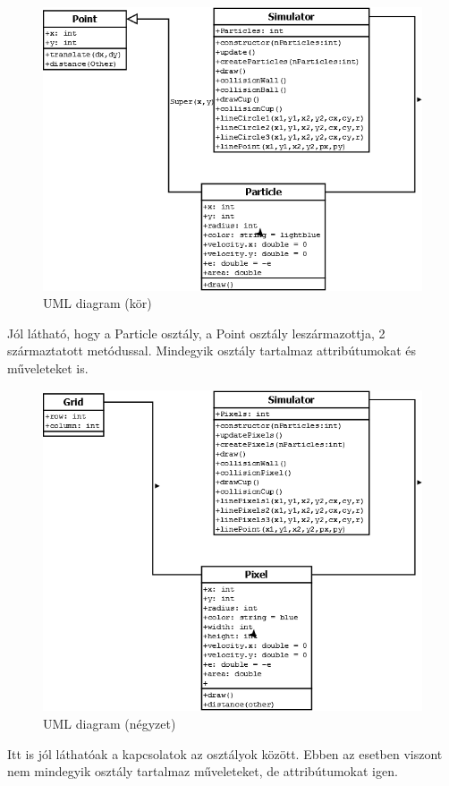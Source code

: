 \begin{figure}[h]
	\centering
	\includegraphics[width=\textwidth]{images/Diagram1.png}
	\caption{UML diagram (kör)}
	\label{fig:dia1}
\end{figure}


Jól látható, hogy a Particle osztály, a Point osztály leszármazottja, 2 származtatott metódussal.
Mindegyik osztály tartalmaz attribútumokat és műveleteket is.



\begin{figure}[h]
	\centering
	\includegraphics[width=\textwidth]{images/Diagram2.png}
	\caption{UML diagram (négyzet)}
	\label{fig:dia2}
\end{figure}


Itt is jól láthatóak a kapcsolatok az osztályok között. Ebben az esetben viszont nem mindegyik osztály tartalmaz műveleteket, de attribútumokat igen. 


